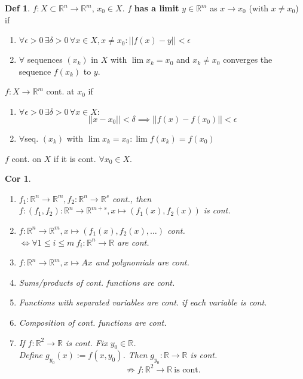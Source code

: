 \documentclass[a4paper, 10pt]{article}
\newtheorem*{corollary}{Cor}
\theoremstyle{definition}
\newtheorem*{definition}{Def}
\newcommand{\R}{\mathbb{R}}
\begin{document}
\begin{definition}
    \(f: X \subset \R^n \to \R^m\), \(x_0 \in X\).
    \(f\) \textbf{has a limit} \(y \in \R^m\) as \(x \to x_0\) (with \(x \neq x_0\)) if
    \begin{enumerate}
        \item \(\forall \epsilon > 0 \, \exists \delta > 0 \, \forall x \in X, x \neq x_0: ||f(x) - y|| < \epsilon\)
        \item \(\forall\) sequences \((x_k)\) in \(X\) with \(\lim x_k = x_0\) and \(x_k \neq x_0\) converges the sequence \(f(x_k)\) to \(y\).
    \end{enumerate}
\end{definition}

\begin{ntheorem*}[Continuity]
    \(f: X \to \R^m\) cont. at \(x_0\) if
    \begin{enumerate}
        \item \(\forall \epsilon > 0 \, \exists \delta > 0 \, \forall x \in X : \)
        \[||x-x_0|| < \delta \implies ||f(x) - f(x_0)|| < \epsilon\]
        \item \(\forall\)seq. \((x_k)\) with \(\lim x_k = x_0: \lim f(x_k) = f(x_0)\)
    \end{enumerate}
    \(f\) cont. on \(X\) if it is cont. \(\forall x_0 \in X\).
\end{ntheorem*}

\begin{corollary}
    \begin{enumerate}
        \item \(f_1: \R^n \to \R^m, f_2: \R^n \to \R^s\) cont., then \(f: (f_1, f_2): \R^n \to \R^{m + s}, x \mapsto (f_1(x), f_2(x))\) is cont.
        \item \(f: \R^n \to \R^m, x \mapsto (f_1(x), f_2(x), \ldots)\) cont.\\  \(\iff  \forall 1 \leq i \leq m \ f_i: \R^n \to \R\) are cont.
        \item \(f: \R^n \to \R^m, x \mapsto Ax\) and polynomials are cont.
        \item Sums/products of cont. functions are cont.
        \item Functions with separated variables are cont. if each variable is cont.
        \item Composition of cont. functions are cont.
        \item If \(f: \R^2 \to \R\) is cont. Fix \(y_0 \in \R\). \\ Define \(g_{y_0}(x) := f(x, y_0)\). Then \(g_{y_0}: \R \to \R\) is cont.
        \[\not\Rightarrow f: \R^2 \to \R \ \text{is cont.}\]
    \end{enumerate}
\end{corollary}
\end{document}
